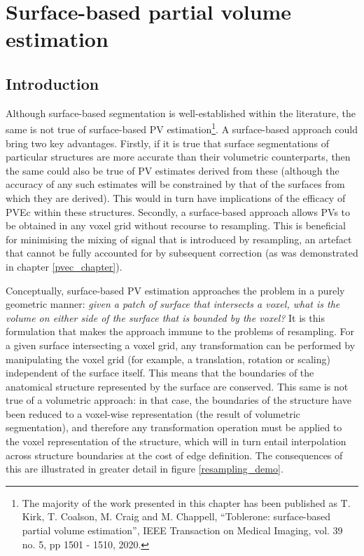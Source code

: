  

\chapter[Surface-based PV estimation]{Surface-based partial volume estimation}
\label{tob_pv_chapter}

\section{Introduction}

Although surface-based segmentation is well-established within the literature, the same is not true of surface-based PV estimation\footnote{The majority of the work presented in this chapter has been published as T. Kirk, T. Coalson, M. Craig and M. Chappell, ``Toblerone: surface-based partial volume estimation'', IEEE Transaction on Medical Imaging, vol. 39 no. 5, pp 1501 - 1510, 2020.}. A surface-based approach could bring two key advantages. Firstly, if it is true that surface segmentations of particular structures are more accurate than their volumetric counterparts, then the same could also be true of PV estimates derived from these (although the accuracy of any such estimates will be constrained by that of the surfaces from which they are derived). This would in turn have implications of the efficacy of PVEc within these structures. Secondly, a surface-based approach allows PVs to be obtained in any voxel grid without recourse to resampling. This is beneficial for minimising the mixing of signal that is introduced by resampling, an artefact that cannot be fully accounted for by subsequent correction (as was demonstrated in chapter \ref{pvec_chapter}). 

Conceptually, surface-based PV estimation approaches the problem in a purely geometric manner: \textit{given a patch of surface that intersects a voxel, what is the volume on either side of the surface that is bounded by the voxel?} It is this formulation that makes the approach immune to the problems of resampling. For a given surface intersecting a voxel grid, any transformation can be performed by manipulating the voxel grid (for example, a translation, rotation or scaling) independent of the surface itself. This means that the boundaries of the anatomical structure represented by the surface are conserved. This same is not true of a volumetric approach: in that case, the boundaries of the structure have been reduced to a voxel-wise representation (the result of volumetric segmentation), and therefore any transformation operation must be applied to the voxel representation of the structure, which will in turn entail interpolation across structure boundaries at the cost of edge definition. The consequences of this are illustrated in greater detail in figure \ref{resampling_demo}. 

